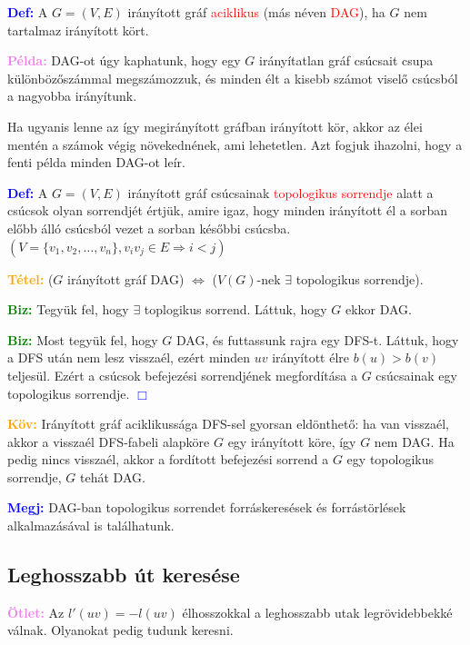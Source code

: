 \documentclass[../szamtud.tex]{subfiles}
\begin{document}
        \textcolor{blue}{\textbf{Def:}} A $G = (V,E)$ irányított gráf \textcolor{red}{aciklikus} (más néven \textcolor{red}{DAG}), ha $G$ nem tartalmaz irányított kört.

        \textcolor{violet}{\textbf{Példa:}} DAG-ot úgy kaphatunk, hogy egy $G$ irányítatlan gráf csúcsait csupa különbözőszámmal megszámozzuk, és minden élt a kisebb számot viselő csúcsból a nagyobba irányítunk.

        Ha ugyanis lenne az így megirányított gráfban irányított kör, akkor az élei mentén a számok végig növekednének, ami lehetetlen. Azt fogjuk ihazolni, hogy a fenti példa minden DAG-ot leír.

        \textcolor{blue}{\textbf{Def:}} A $G = (V,E)$ irányított gráf csúcsainak \textcolor{red}{topologikus sorrendje} alatt a csúcsok olyan sorrendjét értjük, amire igaz, hogy minden irányított él a sorban előbb álló csúcsból vezet a sorban későbbi csúcsba. $(V=\{v_1,v_2,\dots,v_n\},v_iv_j \in E \Rightarrow i < j)$

        \textcolor{orange}{\textbf{Tétel:}} ($G$ irányított gráf DAG) $\Leftrightarrow$ ($V(G)$-nek $\exists$ topologikus sorrendje).

        \textcolor{green}{\textbf{Biz:}} Tegyük fel, hogy $\exists$ toplogikus sorrend. Láttuk, hogy $G$ ekkor DAG. \checkmark

        \textcolor{green}{\textbf{Biz:}} Most tegyük fel, hogy $G$ DAG, és futtassunk rajra egy DFS-t. Láttuk, hogy a DFS után nem lesz visszaél, ezért minden $uv$ irányított élre $b(u) > b(v)$ teljesül. Ezért a csúcsok befejezési sorrendjének megfordítása a $G$ csúcsainak egy topologikus sorrendje.  \textcolor{blue}{$\Box$} 

        \textcolor{orange}{\textbf{Köv:}} Irányított gráf aciklikussága DFS-sel gyorsan eldönthető: ha van visszaél, akkor a visszaél DFS-fabeli alapköre $G$ egy irányított köre, így $G$ nem DAG. Ha pedig nincs visszaél, akkor a fordított befejezési sorrend a $G$ egy topologikus sorrendje, $G$ tehát DAG.

        \textcolor{blue}{\textbf{Megj:}} DAG-ban topologikus sorrendet forráskeresések és forrástörlések alkalmazásával is találhatunk.

    \subsection{Leghosszabb út keresése}

        \textcolor{violet}{\textbf{Ötlet:}} Az $l'(uv) = -l(uv)$ élhosszokkal a leghosszabb utak legrövidebbekké válnak. Olyanokat pedig tudunk keresni.
\end{document}
